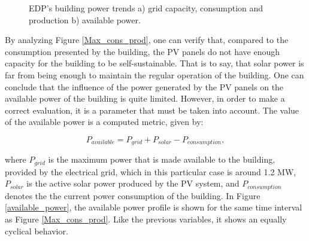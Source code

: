 \begin{figure}[h!]
    \captionsetup[subfigure]{position=b}
    \centering
    \label{fig:ap}
    \caption{EDP's building power trends a) grid capacity, consumption and production b) available power.}
\end{figure}


By analyzing Figure \ref{Max_cons_prod}, one can verify that, compared to the consumption presented by the building, the \ac{PV} panels do not have enough capacity for the building to be self-sustainable. That is to say, that solar power is far from being enough to maintain the regular operation of the building. One can conclude that the influence of the power generated by the \ac{PV} panels on the available power of the building is quite limited. However, in order to make a correct evaluation, it is a parameter that must be taken into account. The value of the available power is a computed metric, given by:

\begin{equation}
   P_{available} = P_{grid} + P_{solar} - P_{consumption},
   \label{available}
\end{equation}

where $P_{grid}$ is the maximum power that is made available to the building, provided by the electrical grid, which in this particular case is around 1.2 MW, $P_{solar}$ is the active solar power produced by the \ac{PV} system, and $P_{consumption}$ denotes the the current power consumption of the building. In Figure \ref{available_power}, the available power profile is shown for the same time interval as Figure \ref{Max_cons_prod}. Like the previous variables, it shows an equally cyclical behavior.


